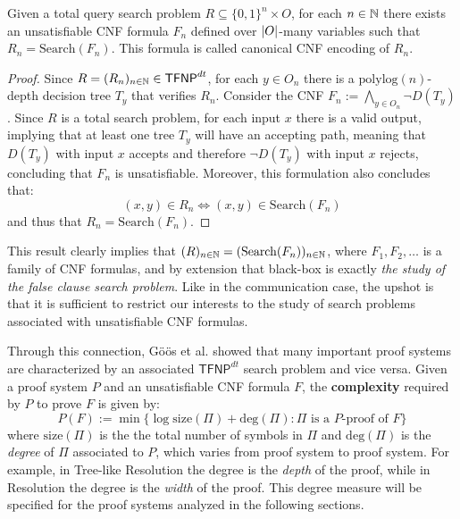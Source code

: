 \begin{proposition}
    \label{Rdt = Search(F)}
 Given a total query search problem $R \subseteq \{0,1\}^n \times O$, for each $n \in \mathbb{N}$ there exists an unsatisfiable CNF formula $F_n$ defined over $\left|O\right|$-many variables such that $R_n = \mathrm{Search}(F_n)$. This formula is called canonical CNF encoding of $R_n$.
\end{proposition}

\begin{proof}
 Since $R = (R_n)_{n \in \mathbb{N}} \in \textsf{TFNP}^{dt}$, for each $y \in O_n$ there is a $\mathrm{polylog}(n)$-depth decision tree $T_y$ that verifies $R_n$. Consider the CNF $F_n := \bigwedge\limits_{y \in O_n} \lnot{D(T_y)}$. Since $R$ is a total search problem, for each input $x$ there is a valid output, implying that at least one tree $T_y$ will have an accepting path, meaning that $D(T_y)$ with input $x$ accepts and therefore $\lnot{D(T_y)}$ with input $x$ rejects, concluding that $F_n$ is unsatisfiable. Moreover, this formulation also concludes that:
    \[(x,y) \in R_n \iff (x,y) \in \mathrm{Search}(F_n)\]
 and thus that $R_n = \mathrm{Search}(F_n)$.

\end{proof}

This result clearly implies that $(R)_{n \in \mathbb{N}} = (\mathrm{Search}(F_n))_{n \in \mathbb{N}}$, where $F_1, F_2, \ldots$ is a family of CNF formulas, and by extension that black-box \TFNP is exactly \textit{the study of the false clause search problem}. Like in the communication \TFNP case, the upshot is that it is sufficient to restrict our interests to the study of search problems associated with unsatisfiable CNF formulas.

\newpage

Through this connection, Göös et al. \cite{adventures_monotone_tfnp} showed that many important proof systems are characterized by an associated $\mathsf{TFNP}^{dt}$ search problem and vice versa. Given a proof system $P$ and an unsatisfiable CNF formula $F$, the \textbf{complexity} required by $P$ to prove $F$ is given by:
\[P(F) := \min\{\log \mathrm{size}(\Pi) + \mathrm{deg}(\Pi) : \Pi \text{ is a $P$-proof of } F\}\]
where $\mathrm{size}(\Pi)$ is the the total number of symbols in $\Pi$ and $\mathrm{deg}(\Pi)$ is the \textit{degree} of $\Pi$ associated to $P$, which varies from proof system to proof system. For example, in Tree-like Resolution the degree is the \textit{depth} of the proof, while in Resolution the degree is the \textit{width} of the proof. This degree measure will be specified for the proof systems analyzed in the following sections.

